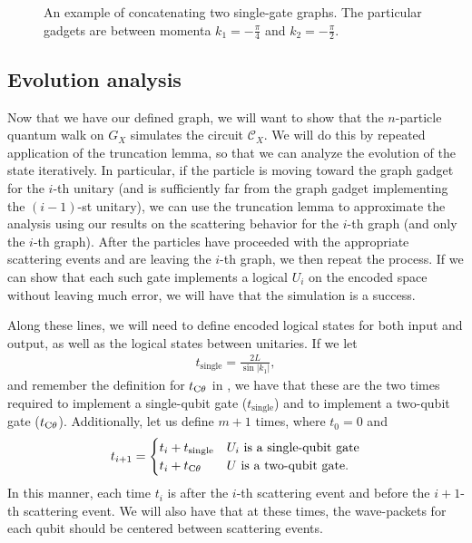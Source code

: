 \documentclass[../thesis-main/thesis-main]{subfiles}
\begin{document}
\begin{figure}
  \centering
   
  \caption[Combining graph example]{An example of concatenating two single-gate graphs.  The particular gadgets are between momenta $k_1 = -\frac{\pi}{4}$ and $k_2 = -\frac{\pi}{2}$.}
  \label{fig:combining_graphs}
\end{figure}

\subsection{Evolution analysis}

Now that we have our defined graph, we will want to show that the $n$-particle quantum walk on $G_X$ simulates the circuit $\mathcal{C}_X$.  We will do this by repeated application of the truncation lemma, so that we can analyze the evolution of the state iteratively.  In particular, if the particle is moving toward the graph gadget for the $i$-th unitary (and is sufficiently far from the graph gadget implementing the $(i-1)$-st unitary), we can use the truncation lemma to approximate the analysis using our results on the scattering behavior for the $i$-th graph (and only the $i$-th graph).  After the particles have proceeded with the appropriate scattering events and are leaving the $i$-th graph, we then repeat the process.  If we can show that each such gate implements a logical $U_i$ on the encoded space without leaving much error, we will have that the simulation is a success.

Along these lines, we will need to define encoded logical states for both input and output, as well as the logical states between unitaries.  If we let 
\begin{align}
  t_{\text{single}} = \frac{2L}{\sin |k_1|},
\end{align}
and remember the definition for $t_{\mathrm{C}\theta}$ in , we have that these are the two times required to implement a single-qubit gate ($t_{\text{single}}$) and to implement a two-qubit gate ($t_{\mathrm{C}\theta}$).  Additionally, let us define $m+1$ times, where $t_0 = 0$ and 
\begin{align}
  t_{i+1} = \begin{cases} t_i + t_{\text{single}} & U_i \text{ is a single-qubit gate}\\
    t_i + t_{\mathrm{C}\theta} & U \text{ is a two-qubit gate}.\end{cases}
\end{align}
In this manner, each time $t_i$ is after the $i$-th scattering event and before the $i+1$-th scattering event.  We will also have that at these times, the wave-packets for each qubit should be centered between scattering events.  
\end{document}
